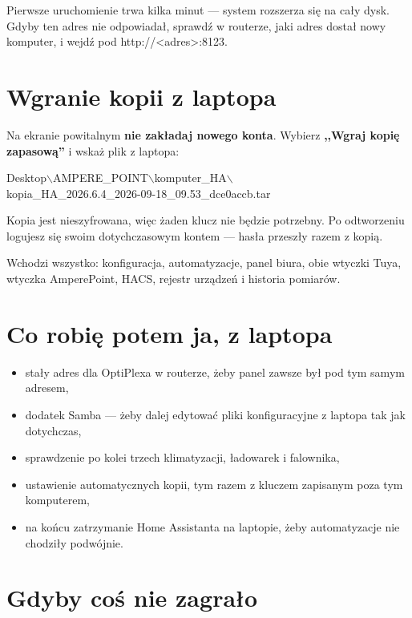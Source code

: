 \documentclass[11pt,a4paper]{article}
\newcommand{\kod}[1]{{\monofont #1}}
\begin{document}
\noindent Pierwsze uruchomienie trwa kilka minut --- system rozszerza si\k{e} na ca\l{}y dysk.
Gdyby ten adres nie odpowiada\l{}, sprawd\'z w routerze, jaki adres dosta\l{} nowy komputer,
i wejd\'z pod \kod{http://<adres>:8123}.

\section{Wgranie kopii z laptopa}

Na ekranie powitalnym \textbf{nie zak\l{}adaj nowego konta}. Wybierz \textbf{,,Wgraj kopi\k{e}
zapasow\k{a}''} i wska\.z plik z laptopa:

\begin{center}
\kod{Desktop$\backslash$AMPERE\_POINT$\backslash$komputer\_HA$\backslash$}\\
\kod{kopia\_HA\_2026.6.4\_2026-09-18\_09.53\_dce0accb.tar}
\end{center}

\noindent Kopia jest nieszyfrowana, wi\k{e}c \.zaden klucz nie b\k{e}dzie potrzebny. Po odtworzeniu
logujesz si\k{e} swoim dotychczasowym kontem --- has\l{}a przesz\l{}y razem z kopi\k{a}.

Wchodzi wszystko: konfiguracja, automatyzacje, panel biura, obie wtyczki Tuya, wtyczka AmperePoint,
HACS, rejestr urz\k{a}dze\'n i historia pomiar\'ow.

\section{Co robi\k{e} potem ja, z laptopa}

\begin{itemize}
  \item sta\l{}y adres dla OptiPlexa w routerze, \.zeby panel zawsze by\l{} pod tym samym adresem,
  \item dodatek Samba --- \.zeby dalej edytowa\'c pliki konfiguracyjne z laptopa tak jak dotychczas,
  \item sprawdzenie po kolei trzech klimatyzacji, \l{}adowarek i falownika,
  \item ustawienie automatycznych kopii, tym razem z kluczem zapisanym poza tym komputerem,
  \item na ko\'ncu zatrzymanie Home Assistanta na laptopie, \.zeby automatyzacje nie chodzi\l{}y podw\'ojnie.
\end{itemize}

\section{Gdyby co\'s nie zagra\l{}o}
\end{document}

